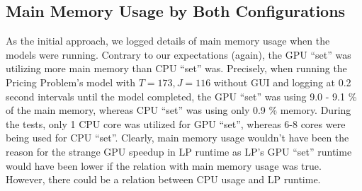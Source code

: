 \begin{appendices}
    \subsection{Main Memory Usage by Both Configurations}
    As the initial approach, we logged details of main memory usage when the models were running. Contrary to our expectations (again), the GPU ``set'' was utilizing more main memory than CPU ``set'' was. Precisely, when running the Pricing Problem's model with $T = 173, J = 116$ without GUI and logging at 0.2 second intervals until the model completed, the GPU ``set'' was using 9.0 - 9.1 \% of the main memory, whereas CPU ``set'' was using only 0.9 \% memory. During the tests, only 1 CPU core was utilized for GPU ``set'', whereas 6-8 cores were being used for CPU ``set''. Clearly, main memory usage wouldn't have been the reason for the strange GPU speedup in LP runtime as LP's GPU ``set'' runtime would have been lower if the relation with main memory usage was true. However, there could be a relation between CPU usage and LP runtime.
    
    \begin{figure}[!htbp]
        \centering
\end{figure}
\end{appendices}

